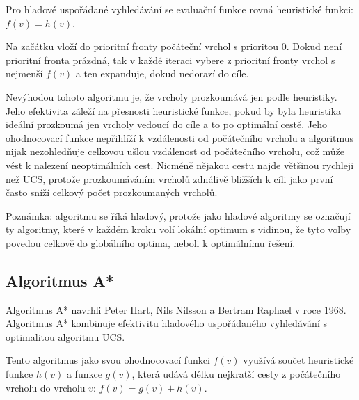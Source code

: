\documentclass[12pt]{report}			%
\begin{document}
			
			Pro hladové uspořádané vyhledávání se evaluační funkce rovná heuristické funkci: $f(v) = h(v)$. 						
			
			Na začátku vloží do prioritní fronty počáteční vrchol s prioritou 0.
			Dokud není prioritní fronta prázdná, tak v každé iteraci vybere z prioritní fronty vrchol s nejmenší $f(v)$ a ten expanduje, dokud nedorazí do cíle.
			
			Nevýhodou tohoto algoritmu je, že vrcholy prozkoumává jen podle heuristiky. %
			Jeho efektivita záleží na přesnosti heuristické funkce, pokud by byla heuristika ideální prozkoumá jen vrcholy vedoucí do cíle a to po optimální cestě. Jeho ohodnocovací funkce nepřihlíží k vzdálenosti od počátečního vrcholu a algoritmus nijak nezohledňuje celkovou ušlou vzdálenost od počátečního vrcholu, což může vést k nalezení neoptimálních cest. Nicméně nějakou cestu najde většinou rychleji než UCS, protože prozkoumáváním vrcholů zdnálivě bližších k cíli jako první často sníží celkový počet prozkoumaných vrcholů.
			
			
			
		
			Poznámka: algoritmu se říká hladový, protože jako hladové algoritmy se označují ty algoritmy, které v každém kroku volí lokální optimum s vidinou, že tyto volby povedou celkově do globálního optima, neboli k optimálnímu řešení. 			
			
			
						
			\subsection{Algoritmus A*}
			Algoritmus A* navrhli Peter Hart, Nils Nilsson a Bertram Raphael v roce 1968. %
			Algoritmus A* kombinuje efektivitu hladového uspořádaného vyhledávání s optimalitou algoritmu UCS.
			
			Tento algoritmus jako svou ohodnocovací funkci $f(v)$ využívá součet heuristické funkce $h(v)$ a funkce $g(v)$, která udává délku nejkratší cesty z počátečního vrcholu do vrcholu $v$: $f(v) = g(v) + h(v)$. 
			
\end{document}
